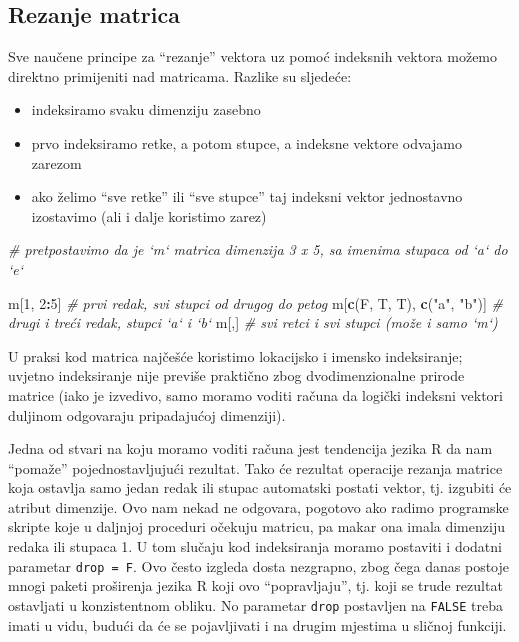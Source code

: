 \documentclass[]{book}
\newenvironment{Shaded}{\begin{snugshade}}{\end{snugshade}}
\newcommand{\KeywordTok}[1]{\textcolor[rgb]{0.13,0.29,0.53}{\textbf{#1}}}
\newcommand{\DecValTok}[1]{\textcolor[rgb]{0.00,0.00,0.81}{#1}}
\newcommand{\StringTok}[1]{\textcolor[rgb]{0.31,0.60,0.02}{#1}}
\newcommand{\CommentTok}[1]{\textcolor[rgb]{0.56,0.35,0.01}{\textit{#1}}}
\newcommand{\OperatorTok}[1]{\textcolor[rgb]{0.81,0.36,0.00}{\textbf{#1}}}
\newcommand{\NormalTok}[1]{#1}
\providecommand{\tightlist}{%
  \setlength{\itemsep}{0pt}\setlength{\parskip}{0pt}}
\theoremstyle{definition}
\theoremstyle{definition}
\theoremstyle{definition}
\theoremstyle{remark}
\begin{document}
\subsection{Rezanje matrica}\label{rezanje-matrica}

Sve naučene principe za ``rezanje'' vektora uz pomoć indeksnih vektora
možemo direktno primijeniti nad matricama. Razlike su sljedeće:

\begin{itemize}
\tightlist
\item
  indeksiramo svaku dimenziju zasebno
\item
  prvo indeksiramo retke, a potom stupce, a indeksne vektore odvajamo
  zarezom
\item
  ako želimo ``sve retke'' ili ``sve stupce'' taj indeksni vektor
  jednostavno izostavimo (ali i dalje koristimo zarez)
\end{itemize}

\begin{Shaded}
\begin{Highlighting}[]
\CommentTok{# pretpostavimo da je `m` matrica dimenzija 3 x 5, sa imenima stupaca od `a` do `e`}

\NormalTok{m[}\DecValTok{1}\NormalTok{, }\DecValTok{2}\OperatorTok{:}\DecValTok{5}\NormalTok{]                       }\CommentTok{# prvi redak, svi stupci od drugog do petog}
\NormalTok{m[}\KeywordTok{c}\NormalTok{(F, T, T), }\KeywordTok{c}\NormalTok{(}\StringTok{"a"}\NormalTok{, }\StringTok{"b"}\NormalTok{)]      }\CommentTok{# drugi i treći redak, stupci `a` i `b`}
\NormalTok{m[,]                            }\CommentTok{# svi retci i svi stupci (može i samo `m`)}
\end{Highlighting}
\end{Shaded}

U praksi kod matrica najčešće koristimo lokacijsko i imensko
indeksiranje; uvjetno indeksiranje nije previše praktično zbog
dvodimenzionalne prirode matrice (iako je izvedivo, samo moramo voditi
računa da logički indeksni vektori duljinom odgovaraju pripadajućoj
dimenziji).

Jedna od stvari na koju moramo voditi računa jest tendencija jezika R da
nam ``pomaže'' pojednostavljujući rezultat. Tako će rezultat operacije
rezanja matrice koja ostavlja samo jedan redak ili stupac automatski
postati vektor, tj. izgubiti će atribut dimenzije. Ovo nam nekad ne
odgovara, pogotovo ako radimo programske skripte koje u daljnjoj
proceduri očekuju matricu, pa makar ona imala dimenziju redaka ili
stupaca 1. U tom slučaju kod indeksiranja moramo postaviti i dodatni
parametar \texttt{drop\ =\ F}. Ovo često izgleda dosta nezgrapno, zbog
čega danas postoje mnogi paketi proširenja jezika R koji ovo
``popravljaju'', tj. koji se trude rezultat ostavljati u konzistentnom
obliku. No parametar \texttt{drop} postavljen na \texttt{FALSE} treba
imati u vidu, budući da će se pojavljivati i na drugim mjestima u
sličnoj funkciji.
\end{document}
